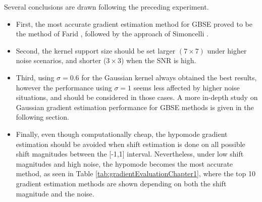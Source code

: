 Several conclusions are drawn following the preceding experiment. 
\begin{itemize}
	\item First, the most accurate gradient estimation method for GBSE proved to be the method of Farid \cite{farid2004differentiation}, followed by the approach of Simoncelli \cite{Simoncelli_1994}. 
	\item Second, the kernel support size should be set larger $(7 \times 7)$ under higher noise scenarios, and shorter ($3 \times 3$) when the SNR is high. 
	\item Third, using $\sigma=0.6$ for the Gaussian kernel always obtained the best results, however the performance using $\sigma=1$ seems less affected by higher noise situations, and should be considered in those cases. A more in-depth study on Gaussian gradient estimation performance for GBSE methods is given in the following section. 
	\item Finally, even though computationally cheap, the hypomode gradient estimation should be avoided when shift estimation is done on all possible shift magnitudes between the [-1,1] interval. Nevertheless, under low shift magnitudes and high noise, the hypomode becomes the most accurate method, as seen in Table \ref{tab:gradientEvaluationChapter1}, where the top 10 gradient estimation methods are shown depending on both the shift magnitude and the noise.
\end{itemize}

